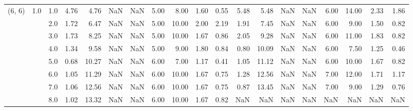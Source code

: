 \begin{tabular}{lllrrrrrrrrrrrrrrrr}
(6, 6) & 1.0 & 1.0  &      4.76 &       4.76 &               NaN &                NaN & 5.00 &   8.00 &             1.60 &                         0.55 &      5.48 &       5.48 &               NaN &                NaN & 6.00 &  14.00 &             2.33 &                         1.86 \\
       &     & 2.0  &      1.72 &       6.47 &               NaN &                NaN & 5.00 &  10.00 &             2.00 &                         2.19 &      1.91 &       7.45 &               NaN &                NaN & 6.00 &   9.00 &             1.50 &                         0.82 \\
       &     & 3.0  &      1.73 &       8.25 &               NaN &                NaN & 5.00 &  10.00 &             1.67 &                         0.86 &      2.05 &       9.28 &               NaN &                NaN & 6.00 &  11.00 &             1.83 &                         0.82 \\
       &     & 4.0  &      1.34 &       9.58 &               NaN &                NaN & 5.00 &   9.00 &             1.80 &                         0.84 &      0.80 &      10.09 &               NaN &                NaN & 6.00 &   7.50 &             1.25 &                         0.46 \\
       &     & 5.0  &      0.68 &      10.27 &               NaN &                NaN & 6.00 &   7.00 &             1.17 &                         0.41 &      1.05 &      11.12 &               NaN &                NaN & 6.00 &  10.00 &             1.67 &                         0.82 \\
       &     & 6.0  &      1.05 &      11.29 &               NaN &                NaN & 6.00 &  10.00 &             1.67 &                         0.75 &      1.28 &      12.56 &               NaN &                NaN & 7.00 &  12.00 &             1.71 &                         1.17 \\
       &     & 7.0  &      1.06 &      12.56 &               NaN &                NaN & 6.00 &  10.00 &             1.67 &                         0.75 &      0.87 &      13.45 &               NaN &                NaN & 7.00 &   9.00 &             1.29 &                         0.76 \\
       &     & 8.0  &      1.02 &      13.32 &               NaN &                NaN & 6.00 &  10.00 &             1.67 &                         0.82 &       NaN &        NaN &               NaN &                NaN &  NaN &    NaN &              NaN &                          NaN \\

\end{tabular}
